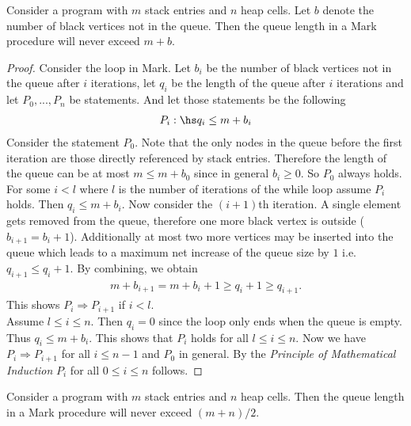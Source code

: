\documentclass{article}
\begin{document}
\begin{claim}
    \label{claimb}
    Consider a program with $m$ stack entries and $n$ heap cells. 
    Let $b$ denote the number of black vertices not in the queue. Then 
    the queue length in a Mark procedure will never exceed $m+b$.
\end{claim}

\begin{proof}
    Consider the loop in Mark.
    Let $b_i$ be the number of black vertices not in the queue after $i$ iterations,
    let $q_i$ be the length of the queue after $i$ iterations and 
    let $P_0,...,P_n$ be statements. And let those statements be
    the following
    \begin{align*}
        P_i:\hs q_i \leq m+b_i
    \end{align*}
    Consider the statement $P_0$. Note that the only nodes in the queue before
    the first iteration are those directly referenced by stack entries. Therefore
    the length of the queue can be at most $m\leq m+b_0$ since in general $b_i\geq 0$. 
    So $P_0$ always holds.\\
    \indent For some $i<l$ where $l$ is the number of iterations of the while loop
    assume $P_i$ holds. Then $q_i\leq m+b_i$. Now consider the
    $(i+1)$th iteration. A single element gets removed from the queue, therefore
    one more black vertex is outside ($b_{i+1}= b_i + 1$). Additionally
    at most two more vertices may be inserted into the queue which leads to a
    maximum net increase of the queue size by $1$ i.e. $q_{i+1}\leq q_i + 1$.
    By combining, we obtain 
    \begin{align*}
        m + b_{i+1} = m + b_{i} + 1 \geq q_{i} + 1 \geq q_{i+1}.
    \end{align*}
    This shows $P_i\Rightarrow P_{i+1}$ if $i<l$.\\
    \indent Assume $l\leq i \leq n$. Then $q_i = 0$ since the loop only ends
    when the queue is empty. Thus $q_i \leq m + b_i$. This shows that
    $P_i$ holds for all $l\leq i\leq n$.
    Now we have $P_i\Rightarrow P_{i+1}$ for all $i\leq n-1$ and $P_0$ in
    general. By the \emph{Principle of Mathematical Induction}
    $P_i$ for all $0\leq i\leq n$ follows. 
\end{proof}

\begin{claim}
    Consider a program with $m$ stack entries and $n$ heap cells. 
    Then the queue length in a Mark procedure will never exceed $(m+n)/2$.
\end{claim}
\end{document}

